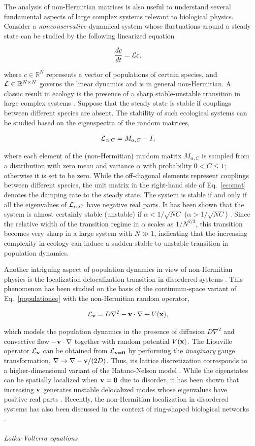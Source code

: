 \documentclass{tADP2e}
\theoremstyle{plain}
\newcommand{\eqn}[1]{
\begin{eqnarray}
	#1
\end{eqnarray}
}
\theoremstyle{plain}
\theoremstyle{definition}
\begin{document}
\vspace{3pt}
\noindent
The analysis of non-Hermitian matrices is also useful to understand several fundamental aspects of large complex systems relevant to biological physics. Consider a \emph{nonconservative} dynamical system whose fluctuations around a steady state can be studied by the following linearized equation
\eqn{\label{populationeq}
\frac{dc}{dt}={\cal L}c,
}
where $c\in{\mathbb R}^N$ represents a vector of populations of certain species, and ${\cal L}\in{\mathbb R}^{N\times N}$ governs the linear dynamics and is in general non-Hermitian. A classic result in ecology is the presence of a sharp stable-unstable transition in large complex systems \cite{MRM72}. Suppose that the steady state is stable if couplings between different species are absent. The stability of such ecological systems can be studied based on the eigenspectra of the random matrices,
\eqn{\label{ecomat}
{\cal L}_{\alpha,C}=M_{\alpha,C}-I,
}
where each element of the (non-Hermitian) random matrix $M_{\alpha,C}$ is sampled from a distribution with  zero mean and variance $\alpha$ with probability $0<C\leq1$; otherwise it is set to be zero. While the off-diagonal elements represent couplings between different species, the unit matrix in the right-hand side of Eq.~\eqref{ecomat} denotes the damping rate to the steady state. The system is stable if and only if all the eigenvalues of ${\cal L}_{\alpha,C}$ have negative real parts. It has been shown that the system is almost certainly stable (unstable) if $\alpha<1/\sqrt{NC}$ ($\alpha>1/\sqrt{NC}$) \cite{MRM72}. Since the relative width of the transition regime in $\alpha$ scales as $1/N^{2/3}$, this transition becomes very sharp in a large system with $N\gg 1$, indicating that  the increasing complexity in ecology can induce a sudden stable-to-unstable transition in population dynamics.

Another intriguing aspect of population dynamics in view of non-Hermitian physics is the localization-delocalization transition in disordered systems \cite{NDR98}. This phenomenon has been studied on the basis of the continuum-space variant of Eq.~\eqref{populationeq} with the non-Hermitian random operator, 
\eqn{\label{reacdiff}
{\cal L}_{\bf v}=D\nabla^2-{\bf v}\cdot\nabla+V({\bf x}),
} 
which models the population dynamics in the presence of diffusion $D\nabla^2$ and convective flow $-{\bf v}\cdot\nabla$ together with  random potential $V({\bf x})$. The Liouville operator  ${\cal L}_{\bf v}$ can be obtained from ${\cal L}_{{\bf v}={\bf 0}}$ by performing the {\emph{imaginary}} gauge transformation, $\nabla\to\nabla-{\bf v}/(2D)$. Thus, its lattice discretization corresponds to a higher-dimensional variant of the Hatano-Nelson model \cite{HN96}. While the eigenstates can be spatially localized when ${\bf v}={\bf 0}$ due to disorder, it has been shown that increasing ${\bf v}$ generates unstable delocalized modes whose eigenvalues have positive real parts \cite{NDR98}. Recently, the non-Hermitian localization in disordered systems has also been discussed in the context of ring-shaped biological networks \cite{AA16non,NDR19}. 
\\ \\ {\it Lotka-Volterra equations}
\end{document}
